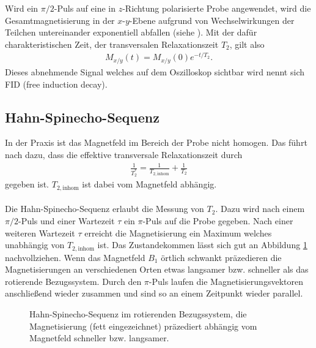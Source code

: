 Wird ein $\pi/2$-Puls auf eine in $z$-Richtung polarisierte Probe angewendet, wird die Gesamtmagnetisierung in der $x$-$y$-Ebene aufgrund von Wechselwirkungen der Teilchen untereinander exponentiell abfallen (siehe \cite{manual}). Mit der dafür charakteristischen Zeit, der transversalen Relaxationszeit $T_2$, gilt also
\begin{align}
  M_{x/y}(t)=M_{x/y}(0) e^{-t/T_2}.
\end{align}
Dieses abnehmende Signal welches auf dem Oszilloskop sichtbar wird nennt sich FID (free induction decay).

\subsection{Hahn-Spinecho-Sequenz}
In der Praxis ist das Magnetfeld im Bereich der Probe nicht homogen. Das führt nach \cite{wikinmr} dazu, dass die effektive transversale Relaxationszeit durch
\begin{align*}
  \frac{1}{T_2^*}=\frac{1}{T_{2,\mathrm{inhom}}}+\frac{1}{T_2}
\end{align*}
gegeben ist. $T_{2,\mathrm{inhom}}$ ist dabei vom Magnetfeld abhängig. \\ \\
Die Hahn-Spinecho-Sequenz erlaubt die Messung von $T_2$. Dazu wird nach einem $\pi/2$-Puls und einer Wartezeit $\tau$ ein $\pi$-Puls auf die Probe gegeben. Nach einer weiteren Wartezeit $\tau$ erreicht die Magnetisierung ein Maximum welches unabhängig von $T_{2,\mathrm{inhom}}$ ist. Das Zustandekommen lässt sich gut an Abbildung \ref{hahn} nachvollziehen. Wenn das Magnetfeld $B_1$ örtlich schwankt präzedieren die Magnetisierungen an verschiedenen Orten etwas langsamer bzw. schneller als das rotierende Bezugssystem. Durch den $\pi$-Puls laufen die Magnetisierungsvektoren anschließend wieder zusammen und sind so an einem Zeitpunkt wieder parallel. 

\begin{figure}[h]
  \centering
  \caption{Hahn-Spinecho-Sequenz im rotierenden Bezugssystem, die Magnetisierung (fett eingezeichnet) präzediert abhängig vom Magnetfeld schneller bzw. langsamer.}
  \label{hahn}
\end{figure}

